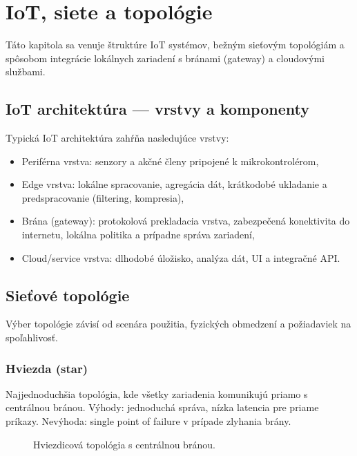 \section{IoT, siete a topológie}
\label{sec:iot-topologies}

Táto kapitola sa venuje štruktúre IoT systémov, bežným sieťovým topológiám a spôsobom integrácie lokálnych zariadení s bránami (gateway) a cloudovými službami.

\subsection{IoT architektúra — vrstvy a komponenty}
Typická IoT architektúra zahŕňa nasledujúce vrstvy:
\begin{itemize}
\item Periférna vrstva: senzory a akčné členy pripojené k mikrokontrolérom,
\item Edge vrstva: lokálne spracovanie, agregácia dát, krátkodobé ukladanie a predspracovanie (filtering, kompresia),
\item Brána (gateway): protokolová prekladacia vrstva, zabezpečená konektivita do internetu, lokálna politika a prípadne správa zariadení,
\item Cloud/service vrstva: dlhodobé úložisko, analýza dát, UI a integračné API.
\end{itemize}

\subsection{Sieťové topológie}
Výber topológie závisí od scenára použitia, fyzických obmedzení a požiadaviek na spoľahlivosť.

\subsubsection*{Hviezda (star)}
Najjednoduchšia topológia, kde všetky zariadenia komunikujú priamo s centrálnou bránou. Výhody: jednoduchá správa, nízka latencia pre priame príkazy. Nevýhoda: single point of failure v prípade zlyhania brány.

\begin{figure}[h]
\centering
{}
\caption{Hviezdicová topológia s centrálnou bránou.}
\end{figure}

